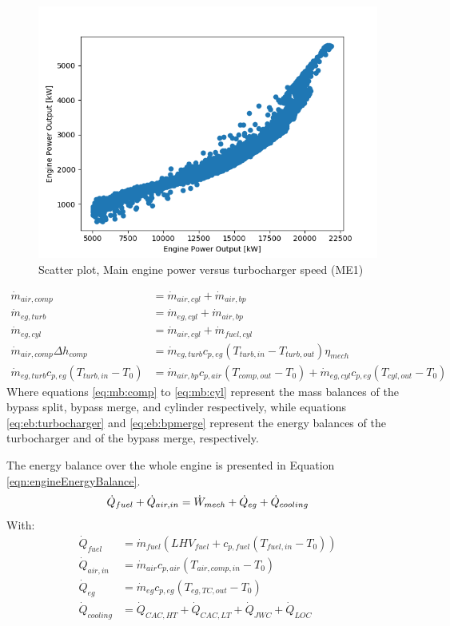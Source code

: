 \documentclass[preprint,12pt]{elsarticle}
\begin{document}
\begin{figure}
	\centering
	\includegraphics[width=0.9\linewidth]{Figures/Scatter_Pme_vs_TCspeed}
	\caption{Scatter plot, Main engine power versus turbocharger speed (ME1)}
	\label{fig:Pme_vs_TCspeed}
\end{figure}

\begin{align}
\dot{m}_{air,comp} & =  \dot{m}_{air,cyl} + \dot{m}_{air,bp} \label{eq:mb:comp} \\ 
\dot{m}_{eg,turb} & = \dot{m}_{eg,cyl} + \dot{m}_{air,bp} \label{eq:mb:turb} \\
\dot{m}_{eg,cyl} & = \dot{m}_{air,cyl} + \dot{m}_{fuel,cyl} \label{eq:mb:cyl} \\
\dot{m}_{air,comp} \Delta h_{comp} & = \dot{m}_{eg,turb} c_{p,eg} (T_{turb,in} - T_{turb,out}) \eta_{mech} \label{eq:eb:turbocharger} \\
\dot{m}_{eg,turb} c_{p,eg} (T_{turb,in} - T_0) & = \dot{m}_{air,bp} c_{p,air} (T_{comp,out} - T_0) + \dot{m}_{eg,cyl} c_{p,eg}  (T_{cyl,out} - T_0) \label{eq:eb:bpmerge}
\end{align}
Where equations \ref{eq:mb:comp} to \ref{eq:mb:cyl} represent the mass balances of the bypass split, bypass merge, and cylinder respectively, while equations \ref{eq:eb:turbocharger} and \ref{eq:eb:bpmerge} represent the energy balances of the turbocharger and of the bypass merge, respectively.

The energy balance over the whole engine is presented in Equation \ref{eqn:engineEnergyBalance}.
\begin{equation}
\dot{Q}_{fuel} + \dot{Q}_{air,in} = \dot{W}_{mech} + \dot{Q}_{eg} + \dot{Q}_{cooling}  \label{eqn:engineEnergyBalance} \\
\end{equation}
With: 
\begin{align}
\dot{Q}_{fuel} & =\dot{m}_{fuel} (LHV_{fuel} + c_{p,fuel} (T_{fuel,in} - T_0))\\
\dot{Q}_{air,in} & = \dot{m}_{air} c_{p,air} (T_{air,comp,in} - T_0) \\ 
\dot{Q}_{eg} & = \dot{m}_{eg} c_{p,eg} (T_{eg,TC,out} - T_0) \\
\dot{Q}_{cooling} & = \dot{Q}_{CAC,HT} + \dot{Q}_{CAC,LT} + \dot{Q}_{JWC} + \dot{Q}_{LOC} \label{eq:eb:cooling}
\end{align}
\end{document}
